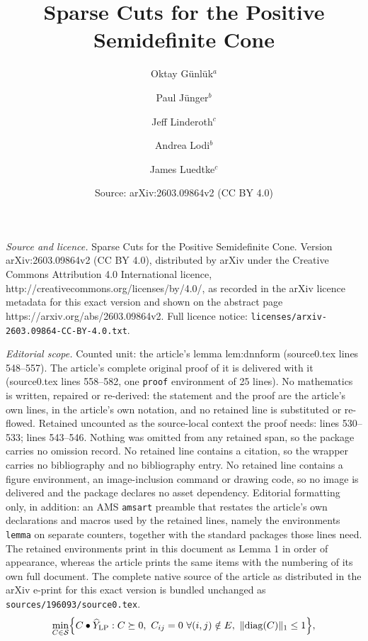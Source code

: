 \documentclass[10pt,a4paper]{amsart}
\title{Sparse Cuts for the Positive Semidefinite Cone}
\author{Oktay G\"unl\"uk$^a$ \and Paul J\"unger$^b$ \and {Jeff Linderoth}$^c$ \and Andrea Lodi$^b$ \and James Luedtke$^c$}
\date{Source: arXiv:2603.09864v2 (CC BY 4.0)}
\newcommand{\matip}[2]{#1 \bullet #2}
\begin{document}
\maketitle

\noindent\emph{Source and licence.} Sparse Cuts for the Positive Semidefinite Cone. Version arXiv:2603.09864v2 (CC BY 4.0), distributed by arXiv under the Creative Commons Attribution 4.0 International licence, http://creativecommons.org/licenses/by/4.0/, as recorded in the arXiv licence metadata for this exact version and shown on the abstract page https://arxiv.org/abs/2603.09864v2. Full licence notice: \texttt{licenses/arxiv-2603.09864-CC-BY-4.0.txt}.\par\smallskip

\noindent\textit{Editorial scope.} Counted unit: the article's lemma lem:dnnform (source0.tex lines 548--557). The article's complete original proof of it is delivered with it (source0.tex lines 558--582, one \texttt{proof} environment of 25 lines). No mathematics is written, repaired or re-derived: the statement and the proof are the article's own lines, in the article's own notation, and no retained line is substituted or re-flowed.  Retained uncounted as the source-local context the proof needs: lines 530--533; lines 543--546.  Nothing was omitted from any retained span, so the package carries no omission record.  No retained line contains a citation, so the wrapper carries no bibliography and no bibliography entry.  No retained line contains a figure environment, an image-inclusion command or drawing code, so no image is delivered and the package declares no asset dependency.  Editorial formatting only, in addition: an AMS \texttt{amsart} preamble that restates the article's own declarations and macros used by the retained lines, namely the environments \texttt{lemma} on separate counters, together with the standard packages those lines need.  The retained environments print in this document as Lemma 1 in order of appearance, whereas the article prints the same items with the numbering of its own full document.  The complete native source of the article as distributed in the arXiv e-print for this exact version is bundled unchanged as \texttt{sources/196093/source0.tex}.
	\begin{equation}
		\label{eq:sdpsep}
		\min_{{C\in \mathcal S}} \Bigl\{ \matip{C}{\widehat{Y}_{\mathrm{LP}}}  : C \succeq 0, \ C_{ij} = 0 \ \forall(i,j) \notin E, \ \| \mathrm{diag}(C)\|_1 \leq 1 \Bigr\},
	\end{equation}
\end{document}
